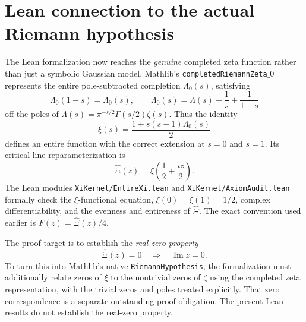 \section{Lean connection to the actual Riemann hypothesis}
\label{sec:leanxi}
The Lean formalization now reaches the \emph{genuine}
completed zeta function rather than just a symbolic
Gaussian model. Mathlib's
\texttt{completedRiemannZeta\(\_0\)}
represents the entire pole-subtracted completion
$\Lambda_0(s)$, satisfying
\[
\Lambda_0(1-s)=\Lambda_0(s),\qquad
\Lambda_0(s)=\Lambda(s)+\frac1s+\frac1{1-s}
\]
off the poles of $\Lambda(s)=\pi^{-s/2}\Gamma(s/2)\zeta(s)$.
Thus the identity
\begin{equation}
\xi(s)=\frac{1+s(s-1)\Lambda_0(s)}{2}
\label{eq:xi_mathi}
\end{equation}
defines an entire function with the correct extension
at $s=0$ and $s=1$. Its critical-line reparameterization is
\[
\widehat\Xi(z)=\xi\!\left(\frac12+\frac{iz}{2}\right).
\]
The Lean modules \texttt{XiKernel/EntireXi.lean} and
\texttt{XiKernel/AxiomAudit.lean} formally check
the $\xi$-functional equation, $\xi(0)=\xi(1)=1/2$,
complex differentiability, and the evenness and
entireness of $\widehat\Xi$.
The exact convention used earlier is
$F(z)=\widehat\Xi(z)/4$.

The proof target is to establish the
\emph{real-zero property}
\[
\widehat\Xi(z)=0\quad\Longrightarrow\quad
\operatorname{Im}z=0.
\]
To turn this into Mathlib's native
\texttt{RiemannHypothesis}, the formalization
must additionally relate zeros of $\xi$ to the
nontrivial zeros of $\zeta$ using the completed
zeta representation, with the trivial zeros
and poles treated explicitly. That zero
correspondence is a separate outstanding
proof obligation. The present Lean results
do not establish the real-zero property.
